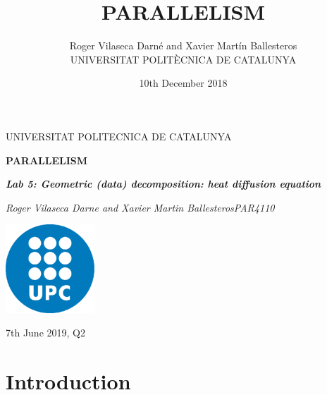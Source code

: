 \documentclass[12pt, a4paper]{article}
\title{PARALLELISM}
\author{Roger Vilaseca Darné and Xavier Martín Ballesteros\\
  \small UNIVERSITAT POLITÈCNICA DE CATALUNYA\\
}
\date{10th December 2018}
\begin{document}
\graphicspath{ {./images} }


\begin{titlepage}
	\centering
	\vspace{1cm}
	{\scshape\Large UNIVERSITAT POLITECNICA DE CATALUNYA\par}
	\vspace{1.5cm}
	{\huge\bfseries PARALLELISM\par}
	\vspace{2cm}
	{\Large\itshape \textbf{Lab 5: Geometric (data) decomposition:
heat diffusion equation}\par}
	\vfill
	{\Large\itshape Roger Vilaseca Darne and Xavier Martin Ballesteros\break PAR4110\par}
	\vfill
	\includegraphics[width=0.25\textwidth]{./images/UPC.png}\par\vspace{1cm}

	\vfill

	{\large 7th June 2019, Q2}
\end{titlepage}


\setcounter{secnumdepth}{5}

\newpage
  \tableofcontents
\newpage


\section{Introduction}
\end{document}
